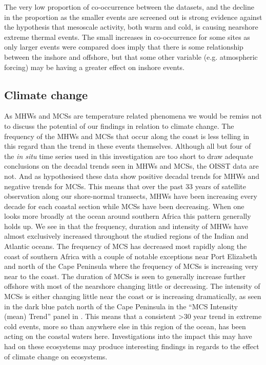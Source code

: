 \documentclass[a4paper,10pt,review]{elsarticle}
\begin{document}
The very low proportion of co-occurrence between the datasets, and the decline in the proportion as the smaller events are screened out is strong evidence against the hypothesis that mesoscale activity, both warm and cold, is causing nearshore extreme thermal events. The small increases in co-occurrence for some sites as only larger events were compared does imply that there is some relationship between the inshore and offshore, but that some other variable (e.g. atmospheric forcing) may be having a greater effect on inshore events.

\subsection{Climate change}
As MHWs and MCSs are temperature related phenomena we would be remiss not to discuss the potential of our findings in relation to climate change. The frequency of the MHWs and MCSs that occur along the coast is less telling in this regard than the trend in these events themselves. Although all but four of the \emph{in situ} time series used in this investigation are too short to draw adequate conclusions on the decadal trends seen in MHWs and MCSs, the OISST data are not. And as hypothesised these data show positive decadal trends for MHWs and negative trends for MCSs. This means that over the past 33 years of satellite observation along our shore-normal transects, MHWs have been increasing every decade for each coastal section while MCSs have been decreasing. When one looks more broadly at the ocean around southern Africa this pattern generally holds up. We see in  that the frequency, duration and intensity of MHWs have almost exclusively increased throughout the studied regions of the Indian and Atlantic oceans. The frequency of MCS has decreased most rapidly along the coast of southern Africa with a couple of notable exceptions near Port Elizabeth and north of the Cape Peninsula where the frequency of MCSs is increasing very near to the coast. The duration of MCSs is seen to generally increase further offshore with most of the nearshore changing little or decreasing. The intensity of MCSs is either changing little near the coast or is increasing dramatically, as seen in the dark blue patch north of the Cape Peninsula in the ``MCS Intensity (mean) Trend'' panel in . This means that a consistent >30 year trend in extreme cold events, more so than anywhere else in this region of the ocean, has been acting on the coastal waters here. Investigations into the impact this may have had on these ecosystems may produce interesting findings in regards to the effect of climate change on ecosystems.
\end{document}
